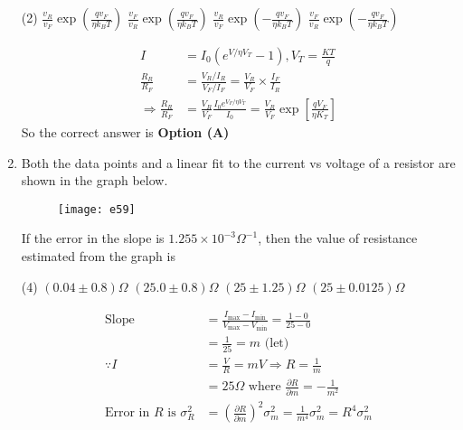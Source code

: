 \begin{enumerate}
	{}
\begin{tasks}(2)
\task[\textbf{A.}] $\frac{v_{R}}{v_{F}} \exp \left(\frac{q v_{F}}{\eta k_{B} T}\right)$
\task[\textbf{B.}] $\frac{v_{F}}{v_{R}} \exp \left(\frac{q v_{F}}{\eta k_{B} T}\right)$
\task[\textbf{C.}]  $\frac{v_{R}}{v_{F}} \exp \left(-\frac{q v_{F}}{\eta k_{B} T}\right)$
\task[\textbf{D.}]  $\frac{v_{F}}{v_{R}} \exp \left(-\frac{q v_{F}}{\eta k_{B} T}\right)$
\end{tasks}
\begin{answer}
\begin{align*}
I&=I_{0}\left(e^{V / \eta V_{T}}-1\right), V_{T}=\frac{K T}{q}\\
\frac{R_{R}}{R_{F}}&=\frac{V_{R} / I_{R}}{V_{F} / I_{F}}=\frac{V_{R}}{V_{F}} \times \frac{I_{F}}{I_{R}}\\
\Rightarrow \frac{R_{R}}{R_{F}}&=\frac{V_{R}}{V_{F}} \frac{I_{0} e^{V_{F} / \eta V_{T}}}{I_{0}}=\frac{V_{R}}{V_{F}} \exp \left[\frac{q V_{F}}{\eta K_{T}}\right]
\end{align*}
So the correct answer is \textbf{Option (A)}
\end{answer}
	\item Both the data points and a linear fit to the current vs voltage of a resistor are shown in the graph below.\\
	\begin{figure}[H]
		\centering
		\texttt{[image: e59]}
	\end{figure}
	If the error in the slope is $1.255 \times 10^{-3} \Omega^{-1}$, then the value of resistance estimated from the graph is
	{}
\begin{tasks}(4)
\task[\textbf{A.}] $(0.04 \pm 0.8) \Omega$
\task[\textbf{B.}] $(25.0 \pm 0.8) \Omega$
\task[\textbf{C.}] $(25 \pm 1.25) \Omega$
\task[\textbf{D.}] $(25 \pm 0.0125) \Omega$
\end{tasks}
\begin{answer}
\begin{align*}
\text{Slope }&=\frac{I_{\max }-I_{\min }}{V_{\max }-V_{\min }}=\frac{1-0}{25-0}\\&=\frac{1}{25}=m\text{ (let)}\\
\because I&=\frac{V}{R}=m V \Rightarrow R=\frac{1}{m}\\&=25 \Omega\text{ where }\frac{\partial R}{\partial m}=-\frac{1}{m^{2}}\\
\text{Error in $R$ is }\sigma_{R}^{2}&=\left(\frac{\partial R}{\partial m}\right)^{2} \sigma_{m}^{2}=\frac{1}{m^{4}} \sigma_{m}^{2}=R^{4} \sigma_{m}^{2}\\

\end{align*}
\end{answer}
\end{enumerate}
